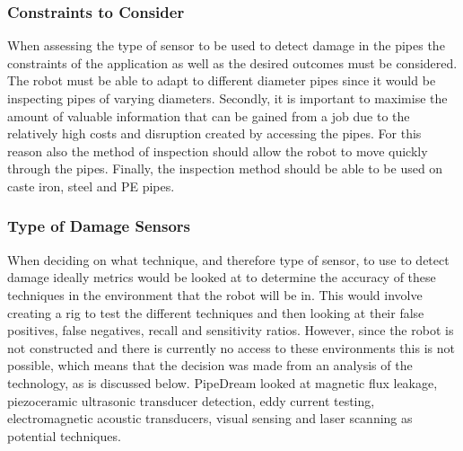 \documentclass[11pt]{article}		%
\begin{document}
	        \subsubsection{Constraints to Consider}
	        
	        When assessing the type of sensor to be used to detect damage in the pipes the constraints of the application as well as the desired outcomes must be considered. 
            The robot must be able to adapt to different diameter pipes since it would be inspecting pipes of varying diameters.
	        Secondly, it is important to maximise the amount of valuable information that can be gained from a job due to the relatively high costs and disruption created by accessing the pipes.
	        For this reason also the method of inspection should allow the robot to move quickly through the pipes. 
	        Finally, the inspection method should be able to be used on caste iron, steel and PE pipes. 
	
	        \subsubsection{Type of Damage Sensors}\label{damagesensors}
	        
        When deciding on what technique, and therefore type of sensor, to use to detect damage ideally metrics would be looked at to determine the accuracy of these techniques in the environment that the robot will be in. This would involve creating a rig to test the different techniques and then looking at their false positives, false negatives, recall and sensitivity ratios. However, since the robot is not constructed and there is currently no access to these environments this is not possible,  which means that the decision was made from an analysis of the technology, as is discussed below. PipeDream looked at magnetic flux leakage, piezoceramic ultrasonic transducer detection, eddy current testing, electromagnetic acoustic transducers, visual sensing and laser scanning as potential techniques.
\end{document}
